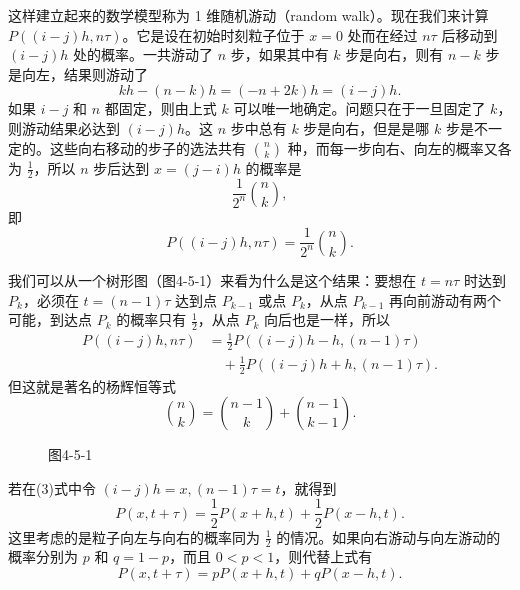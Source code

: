 这样建立起来的数学模型称为 1 维随机游动（random walk）。现在我们来计算 $P((i-j)h,n\tau)$。它是设在初始时刻粒子位于 $x=0$ 处而在经过 $n\tau$ 后移动到 $(i-j)h$ 处的概率。一共游动了 $n$ 步，如果其中有 $k$ 步是向右，则有 $n-k$ 步是向左，结果则游动了
\[
 kh-(n-k)h=(-n+2k)h=(i-j)h.
\]
如果 $i-j$ 和 $n$ 都固定，则由上式 $k$ 可以唯一地确定。问题只在于一旦固定了 $k$，则游动结果必达到 $(i-j)h$。这 $n$ 步中总有 $k$ 步是向右，但是是哪 $k$ 步是不一定的。这些向右移动的步子的选法共有 $\binom nk$ 种，而每一步向右、向左的概率又各为 $\frac12$，所以 $n$ 步后达到 $x=(j-i)h$ 的概率是
\[
 \frac1{2^n}\binom nk,
\]
即
\begin{equation}
 P((i-j)h,n\tau)=\frac1{2^n}\binom nk.
 \tag{2}
\end{equation}

我们可以从一个树形图（图4-5-1）来看为什么是这个结果：要想在 $t=n\tau$ 时达到 $P_k$，必须在 $t=(n-1)\tau$ 达到点 $P_{k-1}$ 或点 $P_k$，从点 $P_{k-1}$ 再向前游动有两个可能，到达点 $P_k$ 的概率只有 $\frac12$，从点 $P_k$ 向后也是一样，所以
\begin{equation}
\begin{aligned}
 P((i-j)h,n\tau)
 &=\frac12P((i-j)h-h,(n-1)\tau)\\
 &\quad+\frac12P((i-j)h+h,(n-1)\tau).
\end{aligned}
 \tag{3}
\end{equation}
但这就是著名的杨辉恒等式
\[
 \binom nk=\binom{n-1}{k}+\binom{n-1}{k-1}.
\]

\begin{figure}[htbp]
\centering
{}
\caption*{图4-5-1}
\end{figure}

若在(3)式中令 $(i-j)h=x,(n-1)\tau=t$，就得到
\begin{equation}
 P(x,t+\tau)=\frac12P(x+h,t)+\frac12P(x-h,t).
 \tag{4}
\end{equation}
这里考虑的是粒子向左与向右的概率同为 $\frac12$ 的情况。如果向右游动与向左游动的概率分别为 $p$ 和 $q=1-p$，而且 $0<p<1$，则代替上式有
\[
 P(x,t+\tau)=pP(x+h,t)+qP(x-h,t).
\]

